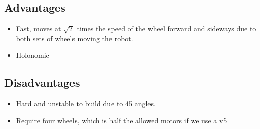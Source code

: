 \documentclass[../../main.tex]{subfiles}
\begin{document}
\subsection{Advantages} 

\begin{itemize} \item Fast, moves at $\sqrt{2}$ times the speed of the wheel forward and sideways due to both sets of wheels moving the robot.
	\item Holonomic

\end{itemize}

\subsection{Disadvantages}

\begin{itemize}
	\item Hard and unstable to build due to 45 \degree angles.
	\item Require four wheels, which is half the allowed motors
	      if we use a v5
\end{itemize}
\end{document}
